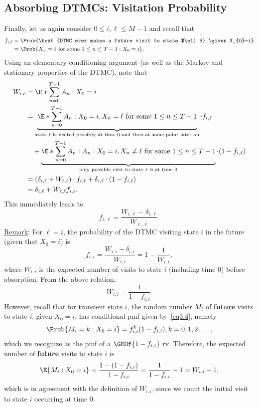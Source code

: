 \subsection*{Absorbing DTMCs: Visitation Probability}
\begin{Regular}
    Finally, let us again consider $0 \leq i, \ell \leq M-1$ and recall that
    \begin{align*}
        f_{i, \ell}
         & =\Prob{\text{DTMC ever makes a future visit to state $\ell$} \given X_{0}=i} \\
         & =\Prob{X_{n}=\ell \text{ for some } 1 \leq n \leq T-1 \given X_{0}=i}.
    \end{align*}
    Using an elementary conditioning argument (as well as the Markov and stationary properties of
    the DTMC), note that
    \begin{align*}
        W_{i,\ell}
         & =\E*{\sum_{n=0}^{T-1} A_n\given X_0=i}                                                                                                                                                           \\
         & =\underbrace{\E*{\sum_{n=0}^{T-1} A_n\given X_0=i,X_n=\ell\text{ for some }1\le n\le T-1}}_{\text{state $\ell$ is visited possibly at time $0$ and then at some point later on}}\cdot f_{i,\ell} \\
         & \quad+\underbrace{\E*{\sum_{n=0}^{T-1} A_n\given A_n\given X_0=i,X_n\ne \ell\text{ for some }1\le n\le T-1}}_{\text{only possible visit to state $\ell$ is at time $0$}}\cdot(1-f_{i,\ell})      \\
         & =(\delta_{i,\ell}+W_{\ell,\ell})\cdot f_{i,\ell}+\delta_{i,\ell}\cdot(1-f_{i,\ell})                                                                                                              \\
         & =\delta_{i,\ell}+W_{\ell,\ell}f_{i,\ell}.
    \end{align*}
    This immediately leads to
    \[ f_{i,\ell}=\frac{W_{i,\ell}-\delta_{i,\ell}}{W_{\ell,\ell}}. \]
    \underline{Remark}: For $ \ell=i $, the probability of the DTMC visiting state $i$ in the future (given that $ X_0=i $) is
    \[ f_{i,i}=\frac{W_{i,i}-\delta_{i,i}}{W_{i,i}}=1-\frac{1}{W_{i,i}},   \]
    where $ W_{i,i} $ is the expected number of visits to state $i$ (including time $0$) before absorption. From the above relation,
    \[ W_{i,i}=\frac{1}{1-f_{i,i}}. \]
    However, recall that for transient state $i$, the random number $M_i$ of \textbf{future} visits to state $i$,
    given $ X_0=i $, has conditional pmf given by~\ref{eq3.4}, namely
    \[ \Prob{M_{i}=k \given X_{0}=i}=f_{i, i}^{k}(1-f_{i, i}), k=0,1,2, \ldots, \]
    which we recognize as the pmf of a $ \GEOf{1-f_{i,i}} $ rv. Therefore, the expected number of \textbf{future} visits to state $i$ is
    \[ \E{M_{i} \given X_{0}=i}=\frac{1-(1-f_{i, i})}{1-f_{i, i}}=\frac{1}{1-f_{i, i}}-1=W_{i, i}-1, \]
    which is in agreement with the definition of $ W_{i,i} $, since we count the initial visit to state $i$ occurring at time $0$.
\end{Regular}
